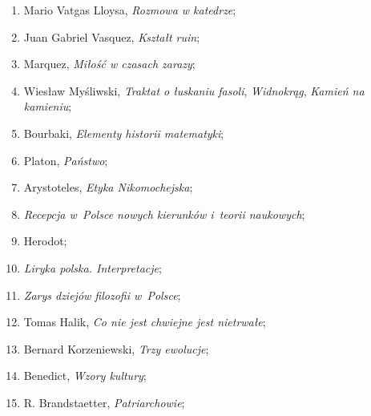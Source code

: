 \documentclass[a4paper,11pt]{article}
\begin{document}
\begin{enumerate}

\item Mario Vatgas Lloysa, \textit{Rozmowa w katedrze};



\item Juan Gabriel Vasquez, \textit{Kształt ruin};



\item Marquez, \textit{Miłość w czasach zarazy};



\item Wiesław Myśliwski, \textit{Traktat o łuskaniu fasoli},
  \textit{Widnokrąg}, \textit{Kamień na kamieniu};



\item Bourbaki, \textit{Elementy historii matematyki};



\item Platon, \textit{Państwo};



\item Arystoteles, \textit{Etyka Nikomochejska};



\item \textit{Recepcja w~Polsce nowych kierunków i~teorii naukowych};



\item Herodot;



\item \textit{Liryka polska. Interpretacje};



\item \textit{Zarys dziejów filozofii w~Polsce};




\item Tomas Halik, \textit{Co nie jest chwiejne jest nietrwałe};



\item Bernard Korzeniewski, \textit{Trzy ewolucje};



\item Benedict, \textit{Wzory kultury};



\item R. Brandstaetter, \textit{Patriarchowie};




\end{enumerate}
\end{document}
